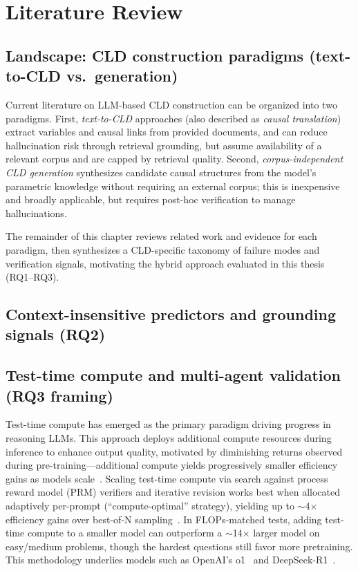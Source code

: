 \section{Literature Review}
\label{sec:literature_review}

\subsection{Landscape: CLD construction paradigms (text-to-CLD vs.\ generation)}
\label{sec:lit_landscape}

Current literature on LLM-based CLD construction can be organized into two paradigms. First, \emph{text-to-CLD} approaches (also described as \emph{causal translation}) extract variables and causal links from provided documents, and can reduce hallucination risk through retrieval grounding, but assume availability of a relevant corpus and are capped by retrieval quality. Second, \emph{corpus-independent CLD generation} synthesizes candidate causal structures from the model's parametric knowledge without requiring an external corpus; this is inexpensive and broadly applicable, but requires post-hoc verification to manage hallucinations.

The remainder of this chapter reviews related work and evidence for each paradigm, then synthesizes a CLD-specific taxonomy of failure modes and verification signals, motivating the hybrid approach evaluated in this thesis (RQ1--RQ3).





\subsection{Context-insensitive predictors and grounding signals (RQ2)}
\label{sec:lit_rq2_signals}



\subsection{Test-time compute and multi-agent validation (RQ3 framing)}
\label{sec:lit_test_time_compute}

Test-time compute has emerged as the primary paradigm driving progress in reasoning LLMs. This approach deploys additional compute resources during inference to enhance output quality, motivated by diminishing returns observed during pre-training---additional compute yields progressively smaller efficiency gains as models scale~\citep{kaplan2020scaling}. Scaling test-time compute via search against process reward model (PRM) verifiers and iterative revision works best when allocated adaptively per-prompt (``compute-optimal'' strategy), yielding up to $\sim$4$\times$ efficiency gains over best-of-N sampling~\citep{snell2024scalingllmtesttimecompute}. In FLOPs-matched tests, adding test-time compute to a smaller model can outperform a $\sim$14$\times$ larger model on easy/medium problems, though the hardest questions still favor more pretraining. This methodology underlies models such as OpenAI's o1~\citep{openai2024reasoning} and DeepSeek-R1~\citep{guo2025deepseek}.

